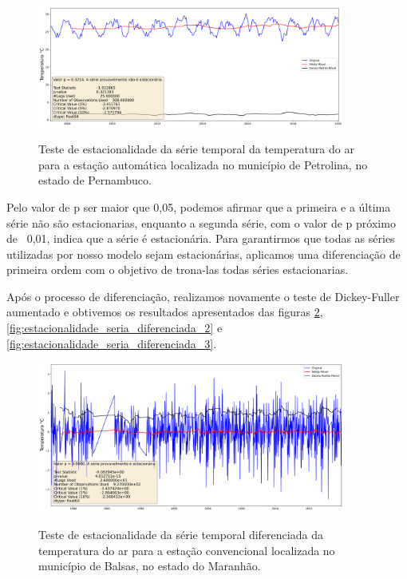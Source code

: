 \begin{figure}[H]
    \centering
    \caption{Teste de estacionalidade da série temporal da temperatura do ar para a estação automática localizada no município de Petrolina, no estado de Pernambuco.}
    \includegraphics[width=0.9\textwidth]{figuras/dickey_fuller_raw_712f3e11658051636f09732a60fb3c1b.png}
    \label{fig:estacionalidade_seria_original_3}
\end{figure}

Pelo valor de p ser maior que 0,05, podemos afirmar que a primeira e a última série não são estacionarias, enquanto a segunda série, com o valor de p próximo de ~0,01, indica que a série é estacionária. Para garantirmos que todas as séries utilizadas por nosso modelo sejam estacionárias, aplicamos uma diferenciação de primeira ordem com o objetivo de trona-las todas séries estacionarias. 

Após o processo de diferenciação, realizamos novamente o teste de Dickey-Fuller aumentado e obtivemos os resultados apresentados das figuras \ref{fig:estacionalidade_seria_diferenciada_1}, \ref{fig:estacionalidade_seria_diferenciada_2} e \ref{fig:estacionalidade_seria_diferenciada_3}.  

\begin{figure}[H]
    \centering
    \caption{Teste de estacionalidade da série temporal diferenciada da temperatura do ar para a estação convencional localizada no município de Balsas, no estado do Maranhão.}
    \includegraphics[width=0.9\textwidth]{figuras/dickey_fuller_diff_82768.png}
    \label{fig:estacionalidade_seria_diferenciada_1}
\end{figure}

